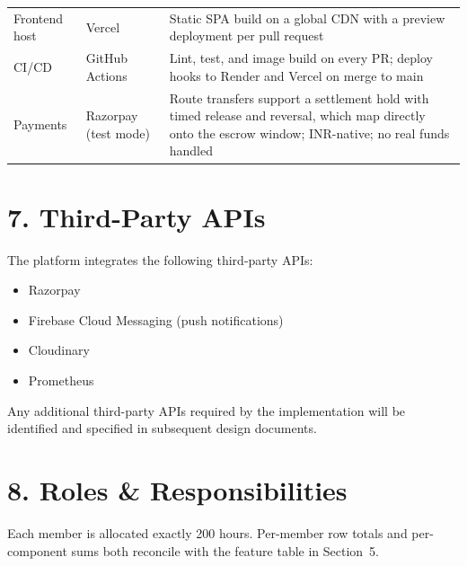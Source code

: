 \documentclass[11pt, a4paper]{article}
\newcommand{\secgap}{\vspace{0.06in}}
\begin{document}
{\begin{longtable}{@{}l p{1.4in} p{2.95in}@{}}
Frontend host & Vercel                    & Static SPA build on a global CDN with a preview deployment per pull request \\
CI/CD        & GitHub Actions             & Lint, test, and image build on every PR; deploy hooks to Render and Vercel on merge to main \\
Payments     & Razorpay (test mode)       & Route transfers support a settlement hold with timed release and reversal, which map directly onto the escrow window; INR-native; no real funds handled \\
\bottomrule
\end{longtable}
}

\secgap
\section*{7. Third-Party APIs}

The platform integrates the following third-party APIs:

\begin{itemize}
    \item Razorpay
    \item Firebase Cloud Messaging (push notifications)
    \item Cloudinary
    \item Prometheus
\end{itemize}

\medskip
\noindent Any additional third-party APIs required by the implementation will be
identified and specified in subsequent design documents.

\secgap
\newpage
\section*{8. Roles \& Responsibilities}

Each member is allocated exactly 200 hours. Per-member row totals and per-component sums
both reconcile with the feature table in Section~5.
\end{document}
